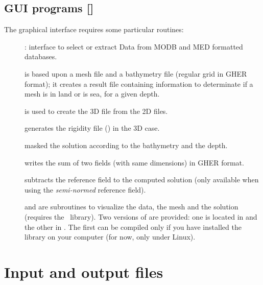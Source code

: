 \subsection[GUI programs]{GUI programs []}

The graphical interface requires some particular routines:
\begin{description}
\item[]: interface to select or extract Data from MODB and MED formatted databases.
\vspace{.25cm}
\item[] is based upon a mesh file and a bathymetry file (regular grid in GHER format); it creates a result file containing information to determinate if a mesh is in land or is sea, for a given depth.
\vspace{.25cm}
\item[] is used to create the 3D file from the 2D files.
\item[] generates the rigidity file () in the 3D case.
\item[] masked the solution according to the bathymetry and the depth.
\item[] writes the sum of two fields (with same dimensions) in GHER format.
\item[] subtracts the reference field to the computed solution (only available when using the \textit{semi-normed} reference field).
\vspace{.25cm}
\item[] and  are subroutines to visualize the data, the mesh and the solution (requires the \plplot\, library). Two versions of  are provided: one is located in  and the other in . The first can be compiled only if you have installed the \plplot library on your computer (for now, only under Linux).
\end{description}



\section{Input and output files}

